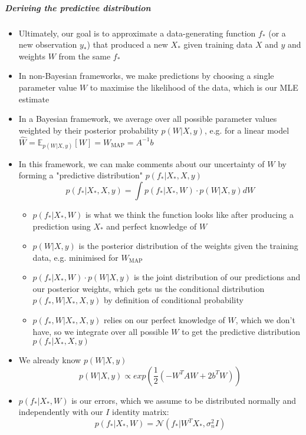 \documentclass[12pt]{article}
\begin{document}
\subparagraph{Deriving the predictive distribution}
\begin{itemize}
    \item Ultimately, our goal is to approximate a data-generating function $f_*$ (or a new observation $y_*$) that produced a new $X_*$ given training data $X$ and $y$ and weights $W$ from the same $f_*$  
    \item In non-Bayesian frameworks, we make predictions by choosing a single parameter value $W$ to maximise the likelihood of the data, which is our MLE estimate
    \item In a Bayesian framework, we average over all possible parameter values weighted by their posterior probability $p(W|X,y)$, e.g. for a linear model $\hat{W} = \mathbb{E}_{p(W|X,y)}[W] = W_\text{MAP} = A^{-1}b$
    \item In this framework, we can make comments about our uncertainty of $W$ by forming a "predictive distribution" $p(f_*|X_*,X,y)$
\begin{equation}
    p(f_*|X_*,X,y) = \int p(f_*|X_*,W) \cdot p(W | X,y)dW
\end{equation}
    \begin{itemize}
        \item $p(f_*|X_*,W)$ is what we think the function looks like after producing a prediction using $X_*$ and perfect knowledge of $W$
        \item $p(W|X,y)$ is the posterior distribution of the weights given the training data, e.g. minimised for $W_\text{MAP}$
        \item $p(f_*|X_*,W) \cdot p(W|X,y)$ is the joint distribution of our predictions and our posterior weights, which gets us the conditional distribution $p(f_*,W|X_*,X,y)$ by definition of conditional probability
        \item $p(f_*,W|X_*,X,y)$ relies on our perfect knowledge of $W$, which we don't have, so we integrate over all possible $W$ to get the predictive distribution $p(f_*|X_*,X,y)$
    \end{itemize}
    \item We already know $p(W|X,y)$
\begin{equation}
    p(W|X,y) \propto exp\left(\frac{1}{2}(-W^TAW + 2b^TW)\right)
\end{equation}
    \item $p(f_*|X_*,W)$ is our errors, which we assume to be distributed normally and independently with our $I$ identity matrix:
\begin{equation}
    p(f_* | X_*, W) = \mathcal{N}(f_* | W^TX_*, \sigma^2_nI)

\end{equation}
\end{itemize}
\end{document}
